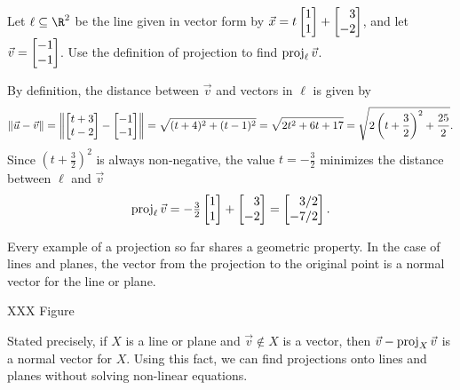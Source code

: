 \begin{example}
	Let $\ell\subseteq \R^2$ be the line given in vector form by $\vec x=t\mat{1\\1}+\mat{3\\-2}$,
	and let $\vec v=\mat{-1\\-1}$. Use the definition of projection to find $\operatorname{proj}_\ell \vec v$.

	By definition, the distance between $\vec v$ and vectors in $\ell$ is given by
	\[
	    \Norm{\vec u-\vec v}=\norm*{\mat{t+3\\t-2}-\mat{-1\\-1}} = \sqrt{(t+4)^2+(t-1)^2}=\sqrt{2t^2+6t+17}=\sqrt{2\left(t+\frac{3}{2}\right)^2+\frac{25}{2}}.
	\]
	Since $(t+\frac{3}{2})^2$ is always non-negative, the value $t=-\frac{3}{2}$ minimizes the distance between $\ell$ and $\vec v$
	\[
	    \Proj_\ell \vec v=-\tfrac{3}{2}\mat{1\\1}+\mat{3\\-2}=\mat{3/2\\-7/2}.
	\]
\end{example}

Every example of a projection so far shares a geometric property. In the case of lines and planes,
the vector from the projection	to the original point is a normal vector for the line or plane.

XXX Figure

Stated precisely, if $X$ is a line or plane and $\vec v\notin X$ is a vector, then $\vec v-\operatorname{proj}_X\vec v$ is a
normal vector for $X$. Using this fact, we can find projections onto lines and planes without solving
non-linear equations.

